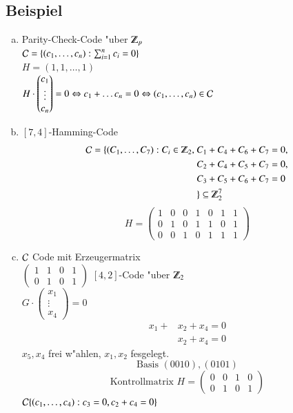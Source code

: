 \subsection{Beispiel}
\begin{enumerate}[a)]
	\item Parity-Check-Code "uber $\Z_p$ \\
	$\mathcal{C} = \lbrace (c_1,\ldots,c_n): \sum^n_{i=1}{c_i}=0 \rbrace$\\ %
	$H=(1,1,\ldots,1)$\\
	$H \cdot
	\begin{pmatrix}
	c_1 \\
	\vdots \\
	c_n
	\end{pmatrix}
	= 0 \Leftrightarrow c_1 + \ldots c_n = 0 \Leftrightarrow (c_1,\ldots,c_n) \in \mathcal{C}$
	\item $[7,4]$-Hamming-Code
	\begin{align*}
	\Code = \lbrace (C_1,\ldots,C_7) : C_i \in \Z_2,\ &C_1 + C_4 + C_6 + C_7 = 0,\\
										&C_2 + C_4 + C_5 + C_7 = 0,\\
										&C_3 + C_5 + C_6 + C_7 = 0\\
										 &\rbrace \subseteq \Z_2^7
	\end{align*}
	\[	H=
		\begin{pmatrix}
			1 & 0 & 0 & 1 & 0 & 1 & 1\\
			0 & 1 & 0 & 1 & 1 & 0 & 1\\
			0 & 0 & 1 & 0 & 1 & 1 & 1
		\end{pmatrix}
	\]
	\item $\mathcal{C}$ Code mit Erzeugermatrix\\
	$
	\begin{pmatrix}
		1 & 1 & 0 & 1\\
		0 & 1 & 0 & 1
	\end{pmatrix}$
	 $[4,2]$-Code "uber $\Z_2$\\
	 $G \cdot
	 \begin{pmatrix}
	 x_1 \\
	 \vdots \\
	 x_4
	 \end{pmatrix}
	 =0$
	 \begin{align*}
	 	x_1+&x_2 + x_4=0\\
	 	&x_2 + x_4 =0
	\end{align*}
	$x_5,x_4$ frei w"ahlen, $x_1,x_2$ fesgelegt.\\
	\[
		\text{Basis }
		(0 0 1 0), (0 1 0 1)
	\]	
	\[
		\text{Kontrollmatrix }
		H=
		\begin{pmatrix}
			0 & 0 & 1 & 0 \\
			0 & 1 & 0 & 1
		\end{pmatrix}
	\]
	$\mathcal{C} \lbrace (c_1,\ldots,c_4) : c_3=0,c_2+c_4=0\rbrace$	
\end{enumerate}

